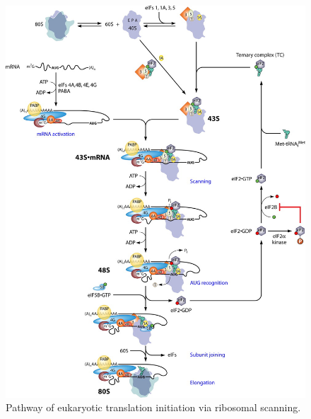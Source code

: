 \documentclass[12pt,openany]{book}
\begin{document}
\begin{figure}[ht]
\includegraphics{./figures/initiation.jpg} 
  \caption{Pathway of eukaryotic translation initiation via ribosomal scanning.
  \label{fig:initiation}}
\end{figure}

\clearpage
\end{document}
